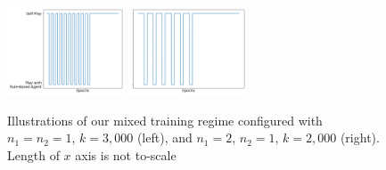 \documentclass[letterpaper]{article} %
\begin{document}
\begin{figure}[t]
\centering
         \includegraphics[width=3.5cm]{mixed illustration n=1.png}
         \includegraphics[width=3.5cm]{mixed illustration n=2.png}
         \caption{Illustrations of our mixed training regime configured  with $n_1=n_2=1$, $k=3,000$ (left), and $n_1 = 2$, $n_2=1$, $k=2,000$ (right). Length of $x$ axis is  not to-scale}
                           \label{fig:training regimes illustrations}
\end{figure}




\end{document}
